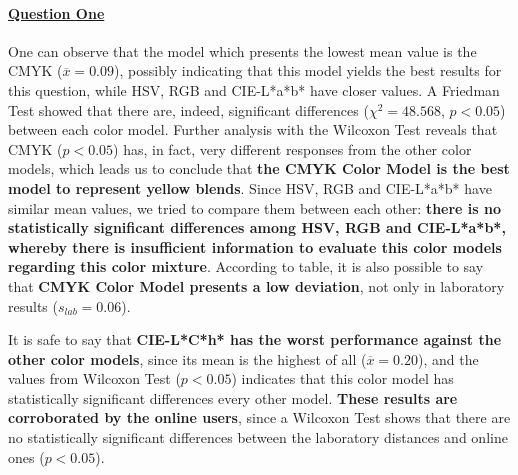 \paragraph{\ul{Question One}}
%
One can observe that the model which presents the lowest mean value is the CMYK ($\overline{x} = 0.09$), possibly indicating that this model yields
the best results for this question, while HSV, RGB and CIE-L*a*b* have closer values. A Friedman Test showed that there are, indeed, significant
differences ($\chi^2 = 48.568$, $p < 0.05$) between each color model.
Further analysis with the Wilcoxon Test reveals that CMYK ($p < 0.05$) has, in fact, very different responses from the other color models, which leads
us to conclude that \textbf{the CMYK Color Model is the best model to represent yellow blends}. Since HSV, RGB and CIE-L*a*b* have similar mean values,
we tried to compare them between each other: \textbf{there is no statistically significant differences among HSV, RGB and CIE-L*a*b*, whereby there is insufficient
information to evaluate this color models regarding this color mixture}. According to table, it is also possible to say that \textbf{CMYK Color Model
presents a low deviation}, not only in laboratory results ($s_{lab} = 0.06$). \par
%
It is safe to say that \textbf{CIE-L*C*h* has the worst performance against the other color models}, since its mean is the highest of all
($\overline{x} = 0.20$), and the values from Wilcoxon Test ($p < 0.05$) indicates that this color model has statistically significant differences every
other model. \textbf{These results are corroborated by the online users}, since a Wilcoxon Test shows that there are no statistically significant
differences between the laboratory distances and online ones ($p < 0.05$).
%
